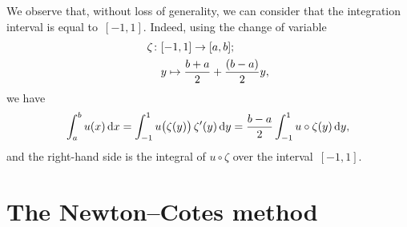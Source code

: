 We observe that,
without loss of generality,
we can consider that the integration interval is equal to~$[-1, 1]$.
Indeed, using the change of variable
\begin{align}
    \notag
    \zeta\colon &[-1, 1] \to [a, b]; \\
    \label{eq:change_of_variable_integration}
                &y \mapsto \frac{b+a}{2} + \frac{(b-a)}{2} y,
\end{align}
we have
\begin{equation}
    \label{eq:change_of_variable_equivalence}
    \int_{a}^{b} u(x) \, \mathrm d x
    = \int_{-1}^{1} u\bigl(\zeta(y)\bigr) \, \zeta'(y) \, \mathrm d y
    = \frac{b-a}{2}\int_{-1}^{1} u \circ \zeta (y) \, \mathrm d y,
\end{equation}
and the right-hand side is the integral of $u \circ \zeta$ over the interval~$[-1, 1]$.

\section{The Newton--Cotes method}
\label{sec:newton_cotes}

